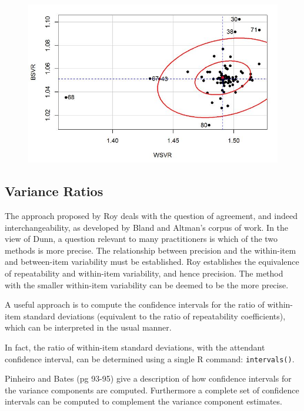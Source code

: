 \documentclass[12pt, a4paper]{report}
\theoremstyle{plain}
\theoremstyle{definition}
\theoremstyle{remark}
\begin{document}
\begin{figure}[h!]
	\centering
	\includegraphics[width=0.9\linewidth]{08-plot1}
	\caption{}
	\label{fig:08-plot1}
\end{figure}




\subsection{Variance Ratios}
The approach proposed by Roy deals with the question of agreement, and indeed interchangeability, as developed by Bland and Altman’s corpus of work.  In the view of Dunn, a question relevant to many practitioners is which of the two methods is more precise.
The relationship between precision and the within-item and between-item variability must be established. Roy establishes the equivalence of repeatability and within-item variability, and hence precision.  The method with the smaller within-item variability can be deemed to be the more precise.

A useful approach is to compute the confidence intervals for the ratio of within-item standard deviations (equivalent to the ratio of repeatability coefficients), which can be interpreted in the usual manner.  

In fact, the ratio of within-item standard deviations, with the attendant confidence interval,  can be determined using a single R command: \texttt{intervals()}.

Pinheiro and Bates (pg 93-95) give a description of how confidence intervals for the variance components are computed. Furthermore a complete set of confidence intervals can be computed to complement the variance component estimates. 
\end{document}
